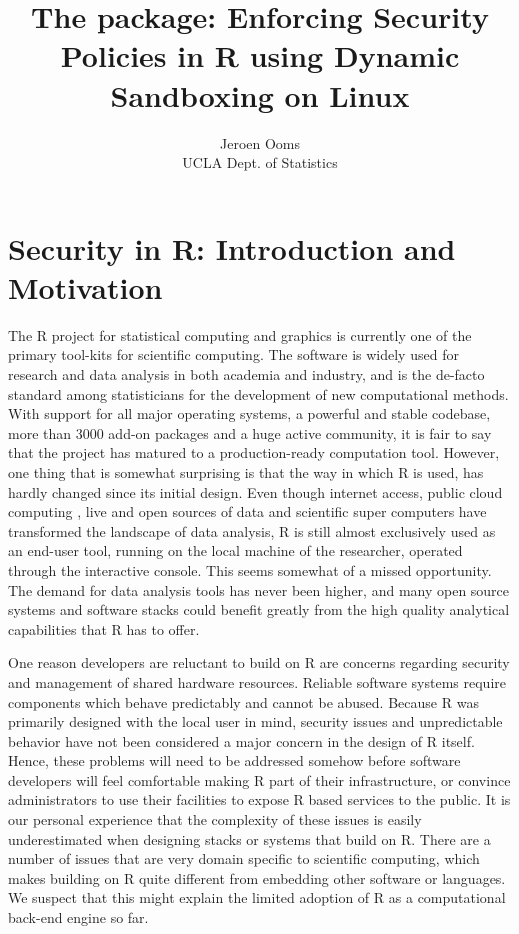 \documentclass[article]{jss}
\author{Jeroen Ooms\\UCLA Dept. of Statistics 
}
\title{The \RAppArmor package: Enforcing Security Policies in R using Dynamic
Sandboxing on Linux}
\newcommand{\R}{\textsf{R}\xspace}
\begin{document}
\section{Security in R: Introduction and Motivation}

The \R project for statistical computing and graphics
\citep{R-project} is currently one of the primary tool-kits for scientific
computing. The software is widely used for research and data analysis in both
academia and industry, and is the de-facto standard among statisticians for the
development of new computational methods. With support for all major
operating systems, a powerful and stable codebase, more than 3000 add-on
packages and a huge active community, it is fair to say that the project has
matured to a production-ready computation tool. However, one thing that is
somewhat surprising is that the way in which \R is used, has hardly
changed since its initial design. Even though internet access, public
cloud computing \citep{armbrust2010view}, live and open sources of data and
scientific super computers have transformed the landscape of data analysis, \R
is still almost exclusively used as an end-user tool, running on the local
machine of the researcher, operated through the interactive console. This seems
somewhat of a missed opportunity. The demand for data analysis tools has never
been higher, and many open source systems and software stacks could benefit
greatly from the high quality analytical capabilities that \R has to
offer.

One reason developers are reluctant to build on \R are concerns regarding
security and management of shared hardware resources. Reliable software systems
require components which behave predictably and cannot be abused. Because
\R was primarily designed with the local user in mind, security issues and
unpredictable behavior have not been considered a major concern in the design
of \R itself. Hence, these problems will need to be addressed somehow before
software developers will feel comfortable making \R part of their
infrastructure, or convince administrators to use their facilities to expose \R
based services to the public. It is our personal experience that the complexity of these issues is easily
underestimated when designing stacks or systems that build on \R.
There are a number of issues that are very domain specific to scientific
computing, which makes building on \R quite different from embedding
other software or languages. We suspect that this might explain the limited
adoption of \R as a computational back-end engine so far.
\end{document}

